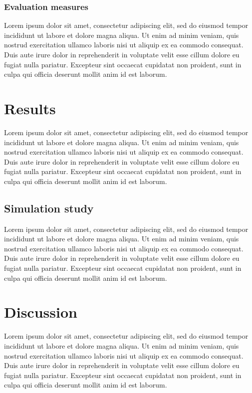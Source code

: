 \documentclass[preprint, 3p,
authoryear]{elsarticle} %
\begin{document}
\hypertarget{evaluation-measures}{%
\subsubsection{Evaluation measures}\label{evaluation-measures}}

Lorem ipsum dolor sit amet, consectetur adipiscing elit, sed do eiusmod
tempor incididunt ut labore et dolore magna aliqua. Ut enim ad minim
veniam, quis nostrud exercitation ullamco laboris nisi ut aliquip ex ea
commodo consequat. Duis aute irure dolor in reprehenderit in voluptate
velit esse cillum dolore eu fugiat nulla pariatur. Excepteur sint
occaecat cupidatat non proident, sunt in culpa qui officia deserunt
mollit anim id est laborum.

\hypertarget{results}{%
\section{Results}\label{results}}

Lorem ipsum dolor sit amet, consectetur adipiscing elit, sed do eiusmod
tempor incididunt ut labore et dolore magna aliqua. Ut enim ad minim
veniam, quis nostrud exercitation ullamco laboris nisi ut aliquip ex ea
commodo consequat. Duis aute irure dolor in reprehenderit in voluptate
velit esse cillum dolore eu fugiat nulla pariatur. Excepteur sint
occaecat cupidatat non proident, sunt in culpa qui officia deserunt
mollit anim id est laborum.

\hypertarget{simulation-study-1}{%
\subsection{Simulation study}\label{simulation-study-1}}

Lorem ipsum dolor sit amet, consectetur adipiscing elit, sed do eiusmod
tempor incididunt ut labore et dolore magna aliqua. Ut enim ad minim
veniam, quis nostrud exercitation ullamco laboris nisi ut aliquip ex ea
commodo consequat. Duis aute irure dolor in reprehenderit in voluptate
velit esse cillum dolore eu fugiat nulla pariatur. Excepteur sint
occaecat cupidatat non proident, sunt in culpa qui officia deserunt
mollit anim id est laborum.

\hypertarget{discussion}{%
\section{Discussion}\label{discussion}}

Lorem ipsum dolor sit amet, consectetur adipiscing elit, sed do eiusmod
tempor incididunt ut labore et dolore magna aliqua. Ut enim ad minim
veniam, quis nostrud exercitation ullamco laboris nisi ut aliquip ex ea
commodo consequat. Duis aute irure dolor in reprehenderit in voluptate
velit esse cillum dolore eu fugiat nulla pariatur. Excepteur sint
occaecat cupidatat non proident, sunt in culpa qui officia deserunt
mollit anim id est laborum.
\end{document}
